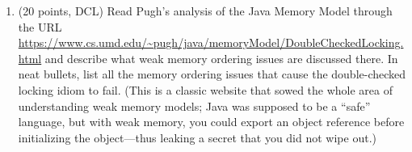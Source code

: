 \documentclass[11pt]{article}
\begin{document}
\begin{enumerate}
  \begin{minipage}{\minpagw}
\end{minipage}  
  
\item (20 points, DCL)
  Read Pugh's analysis of the Java Memory Model through the URL
  \url{https://www.cs.umd.edu/~pugh/java/memoryModel/DoubleCheckedLocking.html}
  and describe what weak memory ordering issues are discussed there.
  In neat bullets, list all the memory ordering issues that cause
  the double-checked locking idiom to fail.
  (This is a classic website that sowed the whole area of understanding
  weak memory models; Java was supposed to be a ``safe'' language, but
  with weak memory, you could export an object reference before
  initializing the object---thus leaking a secret that you did not
  wipe out.)
\begin{minipage}{\minpagw}
\end{minipage}    


\end{enumerate}
\end{document}
